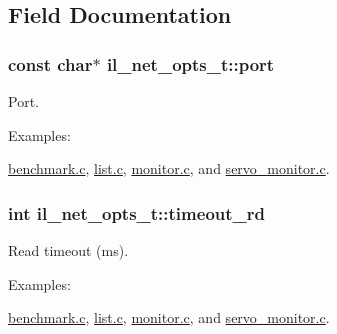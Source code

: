 \subsection{Field Documentation}
\subsubsection[{\texorpdfstring{port}{port}}]{\setlength{\rightskip}{0pt plus 5cm}const char$\ast$ il\+\_\+net\+\_\+opts\+\_\+t\+::port}\hypertarget{structil__net__opts__t_a8b65ee2151ffc84031d96eec857a0189}{}\label{structil__net__opts__t_a8b65ee2151ffc84031d96eec857a0189}


Port. 

\begin{Desc}
\item[Examples\+: ]\par
\hyperlink{benchmark_8c-example}{benchmark.\+c}, \hyperlink{list_8c-example}{list.\+c}, \hyperlink{monitor_8c-example}{monitor.\+c}, and \hyperlink{servo_monitor_8c-example}{servo\+\_\+monitor.\+c}.\end{Desc}
\subsubsection[{\texorpdfstring{timeout\+\_\+rd}{timeout_rd}}]{\setlength{\rightskip}{0pt plus 5cm}int il\+\_\+net\+\_\+opts\+\_\+t\+::timeout\+\_\+rd}\hypertarget{structil__net__opts__t_a1fe07477ccaae61b81dd71b2cf4bde08}{}\label{structil__net__opts__t_a1fe07477ccaae61b81dd71b2cf4bde08}


Read timeout (ms). 

\begin{Desc}
\item[Examples\+: ]\par
\hyperlink{benchmark_8c-example}{benchmark.\+c}, \hyperlink{list_8c-example}{list.\+c}, \hyperlink{monitor_8c-example}{monitor.\+c}, and \hyperlink{servo_monitor_8c-example}{servo\+\_\+monitor.\+c}.\end{Desc}
